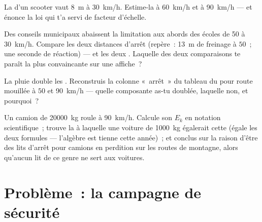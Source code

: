 \begin{exercise}[$\star\star$]\label{exo:g9:kinetic-energy-safety:9}
La  d'un scooter vaut \qty{8}{m} à
\qty{30}{km/h}. Estime-la à \qty{60}{km/h} et à \qty{90}{km/h} --- et
énonce la loi qui t'a servi de facteur d'échelle.
\end{exercise}

\begin{exercise}[$\star\star$]\label{exo:g9:kinetic-energy-safety:10}
Des conseils municipaux abaissent la limitation aux abords des écoles
de \qty{50}{} à \qty{30}{km/h}. Compare les deux distances d'arrêt
(repère~: \qty{13}{m} de freinage à $50$~; une seconde de réaction)
--- et les deux . Laquelle des deux comparaisons
te paraît la plus convaincante sur une affiche~?
\end{exercise}

\begin{exercise}[$\star\star$]\label{exo:g9:kinetic-energy-safety:11}
La pluie double les . Reconstruis la colonne
«~arrêt~» du tableau du  pour route mouillée à $50$ et
\qty{90}{km/h} --- quelle composante as-tu doublée, laquelle non, et
pourquoi~?
\end{exercise}

\begin{exercise}[$\star\star\star$]\label{exo:g9:kinetic-energy-safety:12}
Un camion de \qty{20000}{kg} roule à \qty{90}{km/h}. Calcule son $E_k$
en notation scientifique~; trouve la  à laquelle une voiture de
\qty{1000}{kg} égalerait cette  (égale les deux formules ---
l'algèbre est tienne cette année)~; et conclus sur la raison d'être
des lits d'arrêt pour camions en perdition sur les routes de
montagne, alors qu'aucun lit de ce genre ne sert aux voitures.
\end{exercise}

\section{Problème~: la campagne de sécurité}

